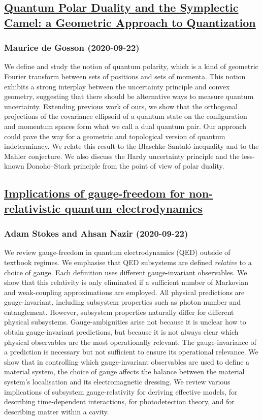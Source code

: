 {\subsection*{\href{http://arxiv.org/abs/2009.10678v2}{Quantum Polar Duality and the Symplectic Camel: a Geometric Approach to  Quantization}}
\subsubsection*{Maurice de Gosson (2020-09-22)}
We define and study the notion of quantum polarity, which is a kind of
geometric Fourier transform between sets of positions and sets of momenta. This
notion exhibits a strong interplay between the uncertainty principle and convex
geometry, suggesting that there should be alternative ways to measure quantum
uncertainty. Extending previous work of ours, we show that the orthogonal
projections of the covariance ellipsoid of a quantum state on the configuration
and momentum spaces form what we call a dual quantum pair. Our approach could
pave the way for a geometric and topological version of quantum indeterminacy.
We relate this result to the Blaschke-Santal\'o inequality and to the Mahler
conjecture. We also discuss the Hardy uncertainty principle and the less-known
Donoho--Stark principle from the point of view of polar duality.

\subsection*{\href{http://arxiv.org/abs/2009.10662v1}{Implications of gauge-freedom for non-relativistic quantum  electrodynamics}}
\subsubsection*{Adam Stokes and Ahsan Nazir (2020-09-22)}
We review gauge-freedom in quantum electrodynamics (QED) outside of textbook
regimes. We emphasise that QED subsystems are defined {\em relative} to a
choice of gauge. Each definition uses different gauge-invariant observables. We
show that this relativity is only eliminated if a sufficient number of
Markovian and weak-coupling approximations are employed. All physical
predictions are gauge-invariant, including subsystem properties such as photon
number and entanglement. However, subsystem properties naturally differ for
different physical subsystems. Gauge-ambiguities arise not because it is
unclear how to obtain gauge-invariant predictions, but because it is not always
clear which physical observables are the most operationally relevant. The
gauge-invariance of a prediction is necessary but not sufficient to ensure its
operational relevance. We show that in controlling which gauge-invariant
observables are used to define a material system, the choice of gauge affects
the balance between the material system's localisation and its electromagnetic
dressing. We review various implications of subsystem gauge-relativity for
deriving effective models, for describing time-dependent interactions, for
photodetection theory, and for describing matter within a cavity.

}

